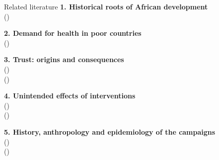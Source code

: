 \documentclass[aspectratio=1610]{beamer}
\newcommand{\refs}[1]{{\footnotesize\color{softgray}(\citealp{#1})}} %
\begin{document}
\begin{frame}{Related literature}
      \textbf{1. Historical roots of African development}\\
      \refs{nunn_2008,nunn_2009,gennaioli_rainer_2007,huillery_2009,michalopoulos_papaioannou_2013,michalopoulos_papaioannou_2016,alsan_2015,cage_rueda_2020,anderson_2018}

      \vspace{0.45em}
      \textbf{2. Demand for health in poor countries}\\
      \refs{dupas_2011,banerjee_etal_2010,dupas_miguel_2017}

      \vspace{0.45em}
      \textbf{3. Trust: origins and consequences}\\
      \refs{algan_cahuc_2010,nunn_wantchekon_2011}\\
      \refs{alsan_wanamaker_2018,alsan_garrick_graziani_2019,martinez_bravo_stegmann_2022}
      
      \vspace{0.45em}
      \textbf{4. Unintended effects of interventions}\\
      \refs{nunn_qian_2014,crost_etal_2014,dube_naidu_2015}\\ 
      \refs{acemoglu_johnson_2007,kazianga_etal_2014}

      \vspace{0.45em}
      \textbf{5. History, anthropology and epidemiology of the campaigns}\\
      \refs{headrick_1994,feldman_etal_2000,giles_vernick_2002,lachenal_2014,lachenal_2017}\\
      \refs{pepin_labbe_2008,pepin_2011}
\end{frame}
\end{document}

